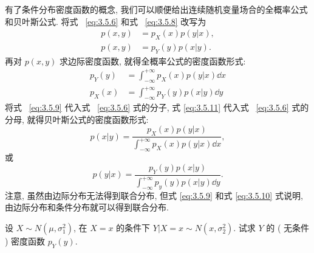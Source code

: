 	有了条件分布密度函数的概念,  我们可以顺便给出连续随机变量场合的全概率公式和贝叶斯公式. 将式~ \eqref{eq:3.5.6} 和式~ \eqref{eq:3.5.8} 改写为
	\begin{align}
		p(x,y)&=p_X(x)p(y|x),\label{eq:3.5.9}	\\
		p(x,y)&=p_Y(y)p(x|y). \label{eq:3.5.10}
	\end{align}
	再对 $p(x,y)$ 求边际密度函数, 就得全概率公式的密度函数形式:
	\begin{align}
		p_{Y}(y) &=\int_{-\infty}^{+\infty} p_{X}(x) p(y | x) \dd x\label{eq:3.5.11} \\
		p_{X}(x) &=\int_{-\infty}^{+\infty} p_{Y}(y) p(x | y) \dd y \label{eq:3.5.12}
	\end{align}
	将式~ \eqref{eq:3.5.9} 代入式~ \eqref{eq:3.5.6} 式的分子, 式 \eqref{eq:3.5.11} 代入式~ \eqref{eq:3.5.6} 式的分母,
	就得贝叶斯公式的密度函数形式:
	\begin{equation}
		p(x | y)=\frac{p_{X}(x) p(y | x)}{\int_{-\infty}^{+\infty} p_{X}(x) p(y | x) \dd x},\label{eq:3.5.13}
	\end{equation}
	或
	\begin{equation}
		p(y | x)=\frac{p_{Y}(y) p(x | y)}{\int_{-\infty}^{+\infty} p_{y}(y) p(x | y) \dd y}.\label{eq:3.5.14}
	\end{equation}
	注意, 虽然由边际分布无法得到联合分布, 但式 \eqref{eq:3.5.9} 和式 \eqref{eq:3.5.10} 式说明, 由边际分布和条件分布就可以得到联合分布.
	\begin{example}\label{exam:3.5.6}
		设 $X\sim N(\mu,\sigma_1^2)$, 在 $X=x$ 的条件下 $Y|X=x\sim N(x,\sigma_2^2)$. 试求 $Y$ 的 ( 无条件 ) 密度函数 $p_Y(y)$.
	\end{example}
